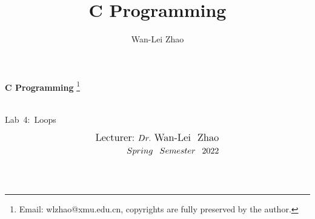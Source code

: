 \documentclass[t]{beamer}
\title{C Programming}
\author{Wan-Lei Zhao}
\newcommand\blfootnote[1]{
  \begingroup
  \renewcommand\thefootnote{}\footnote{#1}
  \addtocounter{footnote}{-1}
  \endgroup
}
\begin{document}
\begin{frame}
   \begin{center}
    \vspace{24pt}
    \Huge\textbf{C Programming}\blfootnote{Email: wlzhao@xmu.edu.cn, copyrights are fully preserved by the author.}\\
     \Huge{\mbox{Lab 4: }Loops}
    \vspace{36pt}
  \end{center}
  \begin{align*}
   \vspace{18pt}
      \large{\mbox{Lecturer:}~Dr.~\mbox{Wan-Lei~~Zhao}} \\
      \large{Spring~~Semester~~2022} \\
   \vspace{30pt}
  \end{align*}
\end{frame}



\section{}
\end{document}
